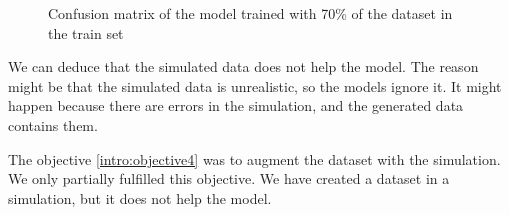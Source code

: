 \begin{figure}[H]
    \centering
    \qquad
    \caption{Confusion matrix of the model trained with 70\% of the dataset in the train set}
    \label{fig:confusion_matrix}
\end{figure}

We can deduce that the simulated data does not help the model. The reason might be that the simulated data is unrealistic, so the models ignore it. It might happen because there are errors in the simulation, and the generated data contains them.

The objective \ref{intro:objective4} was to augment the dataset with the simulation. We only partially fulfilled this objective. We have created a dataset in a simulation, but it does not help the model.


